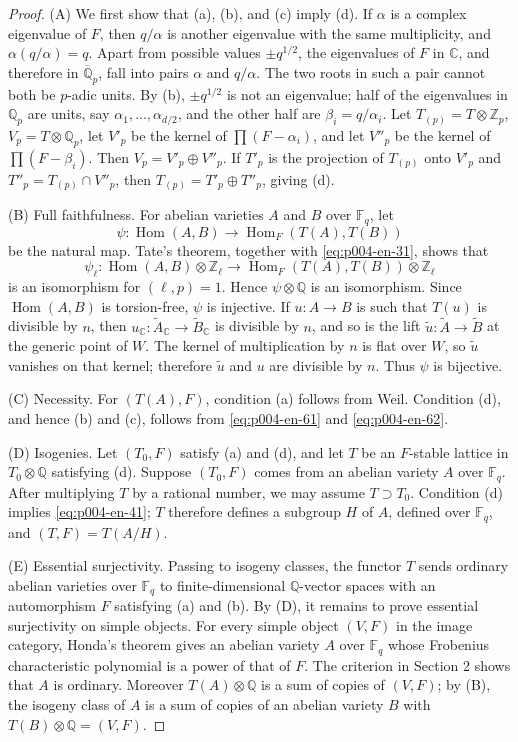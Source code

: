 \documentclass[12pt]{article}
\DeclareMathOperator{\Hom}{Hom}
\newcommand{\Z}{\mathbb{Z}}
\newcommand{\Q}{\mathbb{Q}}
\newcommand{\C}{\mathbb{C}}
\newcommand{\F}{\mathbb{F}}
\theoremstyle{plain}
\theoremstyle{definition}
\theoremstyle{remark}
\begin{document}
\begin{proof}
(A) We first show that (a), (b), and (c) imply (d). If $\alpha$ is a complex eigenvalue of $F$, then $q/\alpha$ is another eigenvalue with the same multiplicity, and $\alpha(q/\alpha)=q$. Apart from possible values $\pm q^{1/2}$, the eigenvalues of $F$ in $\C$, and therefore in $\overline{\Q}_p$, fall into pairs $\alpha$ and $q/\alpha$. The two roots in such a pair cannot both be $p$-adic units. By (b), $\pm q^{1/2}$ is not an eigenvalue; half of the eigenvalues in $\Q_p$ are units, say $\alpha_1,\ldots,\alpha_{d/2}$, and the other half are $\beta_i=q/\alpha_i$. Let $T_{(p)}=T\otimes\Z_p$, $V_p=T\otimes\Q_p$, let $V'_p$ be the kernel of $\prod(F-\alpha_i)$, and let $V''_p$ be the kernel of $\prod(F-\beta_i)$. Then $V_p=V'_p\oplus V''_p$. If $T'_p$ is the projection of $T_{(p)}$ onto $V'_p$ and $T''_p=T_{(p)}\cap V''_p$, then $T_{(p)}=T'_p\oplus T''_p$, giving (d).

(B) Full faithfulness. For abelian varieties $A$ and $B$ over $\F_q$, let
\[
 \psi:\Hom(A,B)\longrightarrow \Hom_F(T(A),T(B))
\]
be the natural map. Tate's theorem, together with \eqref{eq:p004-en-31}, shows that
\[
 \psi_\ell:\Hom(A,B)\otimes\Z_\ell\longrightarrow \Hom_F(T(A),T(B))\otimes\Z_\ell
\]
is an isomorphism for $(\ell,p)=1$. Hence $\psi\otimes\Q$ is an isomorphism. Since $\Hom(A,B)$ is torsion-free, $\psi$ is injective. If $u:A\to B$ is such that $T(u)$ is divisible by $n$, then $u_\C:\widetilde A_\C\to\widetilde B_\C$ is divisible by $n$, and so is the lift $\widetilde u:\widetilde A\to\widetilde B$ at the generic point of $W$. The kernel of multiplication by $n$ is flat over $W$, so $\widetilde u$ vanishes on that kernel; therefore $\widetilde u$ and $u$ are divisible by $n$. Thus $\psi$ is bijective.

(C) Necessity. For $(T(A),F)$, condition (a) follows from Weil. Condition (d), and hence (b) and (c), follows from \eqref{eq:p004-en-61} and \eqref{eq:p004-en-62}.

(D) Isogenies. Let $(T_0,F)$ satisfy (a) and (d), and let $T$ be an $F$-stable lattice in $T_0\otimes\Q$ satisfying (d). Suppose $(T_0,F)$ comes from an abelian variety $A$ over $\F_q$. After multiplying $T$ by a rational number, we may assume $T\supset T_0$. Condition (d) implies \eqref{eq:p004-en-41}; $T$ therefore defines a subgroup $H$ of $A$, defined over $\F_q$, and $(T,F)=T(A/H)$.

(E) Essential surjectivity. Passing to isogeny classes, the functor $T$ sends ordinary abelian varieties over $\F_q$ to finite-dimensional $\Q$-vector spaces with an automorphism $F$ satisfying (a) and (b). By (D), it remains to prove essential surjectivity on simple objects. For every simple object $(V,F)$ in the image category, Honda's theorem gives an abelian variety $A$ over $\F_q$ whose Frobenius characteristic polynomial is a power of that of $F$. The criterion in Section 2 shows that $A$ is ordinary. Moreover $T(A)\otimes\Q$ is a sum of copies of $(V,F)$; by (B), the isogeny class of $A$ is a sum of copies of an abelian variety $B$ with $T(B)\otimes\Q=(V,F)$.
\end{proof}
\end{document}
